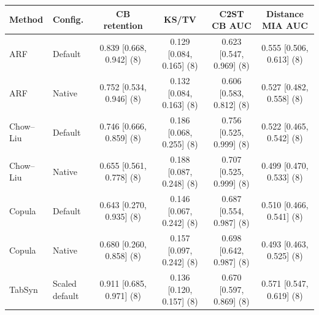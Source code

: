 \begin{tabular}{@{}llcccc@{}}
\toprule
Method & Config. & CB retention & KS/TV & C2ST CB AUC & Distance MIA AUC \\
\midrule
ARF & Default & 0.839 [0.668, 0.942] (8) & 0.129 [0.084, 0.165] (8) & 0.623 [0.547, 0.969] (8) & 0.555 [0.506, 0.613] (8) \\
ARF & Native & 0.752 [0.534, 0.946] (8) & 0.132 [0.084, 0.163] (8) & 0.606 [0.583, 0.812] (8) & 0.527 [0.482, 0.558] (8) \\
Chow--Liu & Default & 0.746 [0.666, 0.859] (8) & 0.186 [0.068, 0.255] (8) & 0.756 [0.525, 0.999] (8) & 0.522 [0.465, 0.542] (8) \\
Chow--Liu & Native & 0.655 [0.561, 0.778] (8) & 0.188 [0.087, 0.248] (8) & 0.707 [0.525, 0.999] (8) & 0.499 [0.470, 0.533] (8) \\
Copula & Default & 0.643 [0.270, 0.935] (8) & 0.146 [0.067, 0.242] (8) & 0.687 [0.554, 0.987] (8) & 0.510 [0.466, 0.541] (8) \\
Copula & Native & 0.680 [0.260, 0.858] (8) & 0.157 [0.097, 0.242] (8) & 0.698 [0.642, 0.987] (8) & 0.493 [0.463, 0.525] (8) \\
TabSyn & Scaled default & 0.911 [0.685, 0.971] (8) & 0.136 [0.120, 0.157] (8) & 0.670 [0.597, 0.869] (8) & 0.571 [0.547, 0.619] (8) \\
\bottomrule
\end{tabular}
